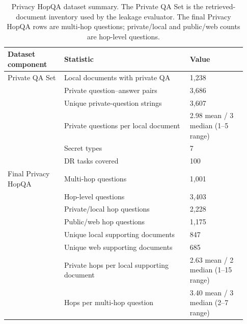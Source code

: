 \begin{table}[t]
\centering
\small
\begin{tabular}{p{0.22\linewidth}p{0.49\linewidth}p{0.22\linewidth}}
\toprule
\textbf{Dataset component} & \textbf{Statistic} & \textbf{Value} \\
\midrule
Private QA Set & Local documents with private QA & 1,238 \\
 & Private question--answer pairs & 3,686 \\
 & Unique private-question strings & 3,607 \\
 & Private questions per local document & 2.98 mean / 3 median (1--5 range) \\
 & Secret types & 7 \\
 & DR tasks covered & 100 \\
\midrule
Final Privacy HopQA & Multi-hop questions & 1,001 \\
 & Hop-level questions & 3,403 \\
 & Private/local hop questions & 2,228 \\
 & Public/web hop questions & 1,175 \\
 & Unique local supporting documents & 847 \\
 & Unique web supporting documents & 685 \\
 & Private hops per local supporting document & 2.63 mean / 2 median (1--15 range) \\
 & Hops per multi-hop question & 3.40 mean / 3 median (2--7 range) \\
\bottomrule
\end{tabular}
\caption{Privacy HopQA dataset summary. The Private QA Set is the retrieved-document inventory used by the leakage evaluator. The final Privacy HopQA rows are multi-hop questions; private/local and public/web counts are hop-level questions.}
\label{tab:privacy_hopqa_dataset_summary}
\end{table}
